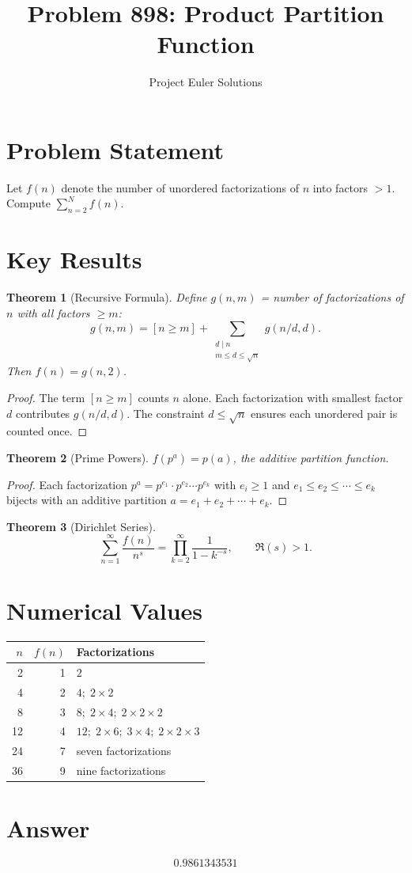 \documentclass[11pt]{article}
\title{Problem 898: Product Partition Function}
\author{Project Euler Solutions}
\date{}
\newtheorem{theorem}{Theorem}
\begin{document}
\maketitle

\section{Problem Statement}
Let $f(n)$ denote the number of unordered factorizations of $n$ into factors $> 1$. Compute $\sum_{n=2}^{N} f(n)$.

\section{Key Results}

\begin{theorem}[Recursive Formula]
Define $g(n, m)$ = number of factorizations of $n$ with all factors $\ge m$:
\[
g(n, m) = [n \ge m] + \sum_{\substack{d \mid n \\ m \le d \le \sqrt{n}}} g(n/d, d).
\]
Then $f(n) = g(n, 2)$.
\end{theorem}

\begin{proof}
The term $[n \ge m]$ counts $n$ alone. Each factorization with smallest factor $d$ contributes $g(n/d, d)$. The constraint $d \le \sqrt{n}$ ensures each unordered pair is counted once.
\end{proof}

\begin{theorem}[Prime Powers]
$f(p^a) = p(a)$, the additive partition function.
\end{theorem}

\begin{proof}
Each factorization $p^a = p^{e_1} \cdot p^{e_2} \cdots p^{e_k}$ with $e_i \ge 1$ and $e_1 \le e_2 \le \cdots \le e_k$ bijects with an additive partition $a = e_1 + e_2 + \cdots + e_k$.
\end{proof}

\begin{theorem}[Dirichlet Series]
\[
\sum_{n=1}^{\infty} \frac{f(n)}{n^s} = \prod_{k=2}^{\infty} \frac{1}{1 - k^{-s}}, \qquad \Re(s) > 1.
\]
\end{theorem}

\section{Numerical Values}
\begin{center}
\begin{tabular}{r|r|l}
$n$ & $f(n)$ & Factorizations \\ \hline
2 & 1 & $2$ \\
4 & 2 & $4;\; 2\times 2$ \\
8 & 3 & $8;\; 2\times 4;\; 2\times 2\times 2$ \\
12 & 4 & $12;\; 2\times 6;\; 3\times 4;\; 2\times 2\times 3$ \\
24 & 7 & seven factorizations \\
36 & 9 & nine factorizations
\end{tabular}
\end{center}

\section{Answer}

\[
\boxed{0.9861343531}
\]
\end{document}
